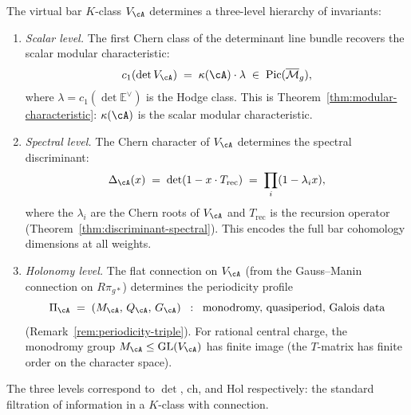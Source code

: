 \begin{proposition}\label{prop:characteristic-hierarchy}
The virtual bar $K$-class $V_\cA$ determines a three-level
hierarchy of invariants:
\begin{enumerate}[label=\textup{(L\arabic*)}]
\item \emph{Scalar level.}
 The first Chern class of the determinant line bundle recovers the
 scalar modular characteristic:
 \[
 c_1(\det V_\cA)
 \;=\;
 \kappa(\cA) \cdot \lambda
 \;\in\; \operatorname{Pic}(\overline{\mathcal{M}}_g),
 \]
 where $\lambda = c_1(\det \mathbb{E}^\vee)$ is the Hodge class.
 This is Theorem~\textup{\ref{thm:modular-characteristic}}:
 $\kappa(\cA)$ is the scalar modular characteristic.

\item \emph{Spectral level.}
 The Chern character of $V_\cA$ determines the spectral
 discriminant:
 \[
 \Delta_\cA(x)
 \;=\;
 \det(1 - x \cdot T_{\mathrm{rec}})
 \;=\;
 \prod_i (1 - \lambda_i x),
 \]
 where the $\lambda_i$ are the Chern roots of $V_\cA$
 and $T_{\mathrm{rec}}$ is the recursion operator
 \textup{(}Theorem~\textup{\ref{thm:discriminant-spectral})}.
 This encodes the full bar cohomology dimensions at all weights.

\item \emph{Holonomy level.}
 The flat connection on $V_\cA$ (from the Gauss--Manin connection
 on $R\pi_{g*}$) determines the periodicity profile
 \[
 \Pi_\cA \;=\; (M_\cA,\, Q_\cA,\, G_\cA)
 \;\;:\;\;
 \text{monodromy, quasiperiod, Galois data}
 \]
 \textup{(}Remark~\textup{\ref{rem:periodicity-triple})}.
 For rational central charge, the monodromy group
 $M_\cA \leq \mathrm{GL}(V_\cA)$ has finite image
 (the $T$-matrix has finite order on the character space).
\end{enumerate}
The three levels correspond to $\det$, $\mathrm{ch}$, and
$\mathrm{Hol}$ respectively: the standard filtration of
information in a $K$-class with connection.
\end{proposition}

